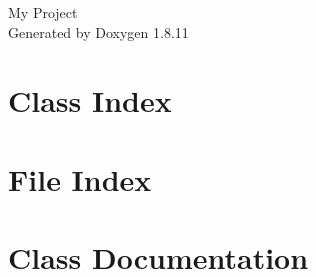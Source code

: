 \documentclass[twoside]{book}
\newcommand{\+}{\discretionary{\mbox{\scriptsize$\hookleftarrow$}}{}{}}
\newcommand{\clearemptydoublepage}{%
  \newpage{\pagestyle{empty}\cleardoublepage}%
}
\begin{document}
\hypersetup{pageanchor=false,
             bookmarksnumbered=true,
             pdfencoding=unicode
            }
\begin{titlepage}
\vspace*{7cm}
\begin{center}%
{\Large My Project }\\
\vspace*{1cm}
{\large Generated by Doxygen 1.8.11}\\
\end{center}
\end{titlepage}
\clearemptydoublepage
\tableofcontents
\clearemptydoublepage
{}
\hypersetup{pageanchor=true}

\chapter{Class Index}

\chapter{File Index}

\chapter{Class Documentation}








































\end{document}
